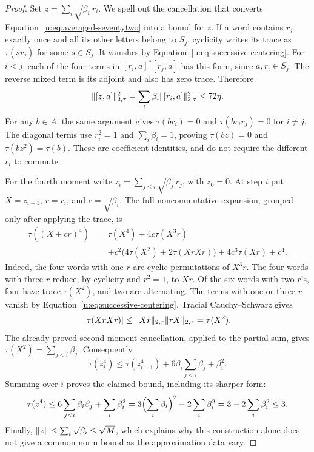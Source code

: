 \begin{proof}
Set $z=\sum_i\sqrt{\beta_i}\,r_i$.  We spell out the cancellation that
converts Equation~\eqref{u:eq:averaged-seventytwo} into a bound for $z$.
If a word contains $r_j$ exactly once and all its other letters belong
to $S_j$, cyclicity writes its trace as $\tau(sr_j)$ for some $s\in S_j$.
It vanishes by Equation~\eqref{u:eq:successive-centering}.  For $i<j$,
each of the four terms in
$[r_i,a]^*[r_j,a]$ has this form, since $a,r_i\in S_j$.  The reverse
mixed term is its adjoint and also has zero trace.  Therefore
\[
 \lVert[z,a]\rVert_{2,\tau}^2
 =\sum_i\beta_i\lVert[r_i,a]\rVert_{2,\tau}^2\le72\eta.
\]
For any $b\in A$, the same argument gives $\tau(br_i)=0$ and
$\tau(br_ir_j)=0$ for $i\ne j$.  The diagonal terms use $r_i^2=1$ and
$\sum_i\beta_i=1$, proving
$\tau(bz)=0$ and $\tau(bz^2)=\tau(b)$.  These are coefficient identities,
and do not require the different $r_i$ to commute.

For the fourth moment write
$z_i=\sum_{j\le i}\sqrt{\beta_j}\,r_j$, with $z_0=0$.  At step $i$ put
$X=z_{i-1}$, $r=r_i$, and $c=\sqrt{\beta_i}$.  The full noncommutative
expansion, grouped only after applying the trace, is
\begin{align*}
 \tau((X+cr)^4)
 ={}&\tau(X^4)+4c\tau(X^3r)\\
 &+c^2\bigl(4\tau(X^2)+2\tau(XrXr)\bigr)
   +4c^3\tau(Xr)+c^4.
\end{align*}
Indeed, the four words with one $r$ are cyclic permutations of $X^3r$.
The four words with three $r$ reduce, by cyclicity and $r^2=1$, to
$Xr$.  Of the six words with two $r$'s, four have trace $\tau(X^2)$,
and two are alternating.  The terms with one or three $r$ vanish by
Equation~\eqref{u:eq:successive-centering}.  Tracial Cauchy--Schwarz gives
\[
 |\tau(XrXr)|
 \le\lVert Xr\rVert_{2,\tau}\lVert rX\rVert_{2,\tau}
 =\tau(X^2).
\]
The already proved second-moment cancellation, applied to the partial
sum, gives $\tau(X^2)=\sum_{j<i}\beta_j$.  Consequently
\[
 \tau(z_i^4)\le\tau(z_{i-1}^4)
       +6\beta_i\sum_{j<i}\beta_j+\beta_i^2.
\]
Summing over $i$ proves the claimed bound, including its sharper form:
\begin{equation}
 \tau(z^4)\le6\sum_{j<i}\beta_i\beta_j+\sum_i\beta_i^2
   =3\Bigl(\sum_i\beta_i\Bigr)^2-2\sum_i\beta_i^2
   =3-2\sum_i\beta_i^2\le3.
 \label{u:eq:averaged-fourth}
\end{equation}
Finally, $\lVert z\rVert\le\sum_i\sqrt{\beta_i}\le\sqrt M$, which explains
why this construction alone does not give a common norm bound as the
approximation data vary.
\end{proof}

